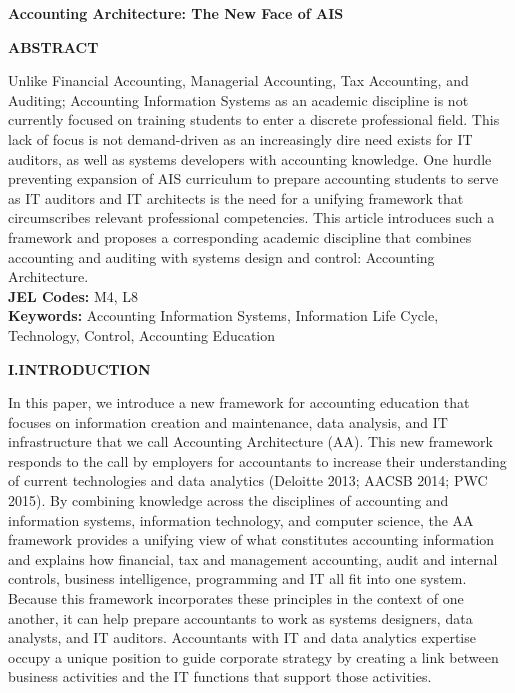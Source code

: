 \documentclass[12pt]{article}
\newcommand{\Abstract}[0]{\centerline{\textbf{\MakeUppercase{Abstract}}}\medskip{}}
\newcommand{\Section}[2]{\vspace{.2in}\centerline{\normalsize{}\textbf{#1\quad{}\MakeUppercase{#2}}}\nopagebreak{}\smallskip{}\indent{}}
\begin{document}
\doublespace{}
\thispagestyle{empty}
{\centerline{\large{}\textbf{Accounting Architecture: The New Face of AIS}}}\vspace{.1in}
\Abstract{}
Unlike Financial Accounting, Managerial Accounting, Tax Accounting, and Auditing; Accounting Information Systems as an academic discipline is not currently focused on training students to enter a discrete professional field. This lack of focus is not demand-driven as an increasingly dire need exists for IT auditors, as well as systems developers with accounting knowledge. One hurdle preventing expansion of AIS curriculum to prepare accounting students to serve as IT auditors and IT architects is the need for a unifying framework that circumscribes relevant professional competencies. This article introduces such a framework and proposes a corresponding academic discipline that combines accounting and auditing with systems design and control: Accounting Architecture.\\[.2in]
\textbf{JEL Codes:} M4, L8\\[.1in]
\textbf{Keywords:} Accounting Information Systems, Information Life Cycle, Technology, Control, Accounting Education\\[.2in]
\newpage{}
\setcounter{page}{1}

\Section{I.}{Introduction}
In this paper, we introduce a new framework for accounting education that focuses on information creation and maintenance, data analysis, and IT infrastructure that we call Accounting Architecture (AA). This new framework responds to the call by employers for accountants to increase their understanding of current technologies and data analytics (Deloitte 2013; AACSB 2014; PWC 2015). By combining knowledge across the disciplines of accounting and information systems, information technology, and computer science, the AA framework provides a unifying view of what constitutes accounting information and explains how financial, tax and management accounting, audit and internal controls, business intelligence, programming and IT all fit into one system. Because this framework incorporates these principles in the context of one another, it can help prepare accountants to work as systems designers, data analysts, and IT auditors. Accountants with IT and data analytics expertise occupy a unique position to guide corporate strategy by creating a link between business activities and the IT functions that support those activities.
\end{document}
